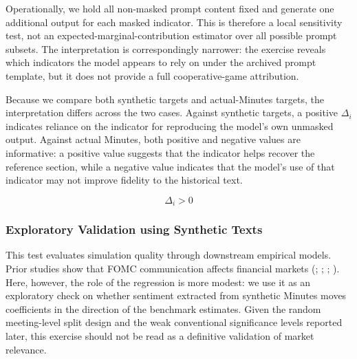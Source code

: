 Operationally, we hold all non-masked prompt content fixed and generate one additional output for each masked indicator. This is therefore a local sensitivity test, not an expected-marginal-contribution estimator over all possible prompt subsets. The interpretation is correspondingly narrower: the exercise reveals which indicators the model appears to rely on under the archived prompt template, but it does not provide a full cooperative-game attribution.

Because we compare both synthetic targets and actual-Minutes targets, the interpretation differs across the two cases. Against synthetic targets, a positive $\Delta_i$ indicates reliance on the indicator for reproducing the model's own unmasked output. Against actual Minutes, both positive and negative values are informative: a positive value suggests that the indicator helps recover the reference section, while a negative value indicates that the model's use of that indicator may not improve fidelity to the historical text.

\begin{equation*}
\Delta_i > 0
\end{equation*}



\subsubsection*{Exploratory Validation using Synthetic Texts}

This test evaluates simulation quality through downstream empirical models. Prior studies show that FOMC communication affects financial markets (\cite{rosa2013financial}; \cite{rosa2011high}; \cite{huang2021economic}; \cite{tadle2022fomc}). Here, however, the role of the regression is more modest: we use it as an exploratory check on whether sentiment extracted from synthetic Minutes moves coefficients in the direction of the benchmark estimates. Given the random meeting-level split design and the weak conventional significance levels reported later, this exercise should not be read as a definitive validation of market relevance.



